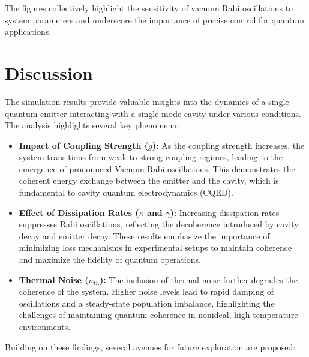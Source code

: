 \documentclass[conference]{IEEEtran}
\begin{document}
The figures collectively highlight the sensitivity of vacuum Rabi oscillations to system parameters and underscore the importance of precise control for quantum applications.

\section{Discussion}
The simulation results provide valuable insights into the dynamics of a single quantum emitter interacting with a single-mode cavity under various conditions. The analysis highlights several key phenomena:

\begin{itemize}
    \item \textbf{Impact of Coupling Strength ($g$):} As the coupling strength increases, the system transitions from weak to strong coupling regimes, leading to the emergence of pronounced Vacuum Rabi oscillations. This demonstrates the coherent energy exchange between the emitter and the cavity, which is fundamental to cavity quantum electrodynamics (CQED).
    \item \textbf{Effect of Dissipation Rates ($\kappa$ and $\gamma$):} Increasing dissipation rates suppresses Rabi oscillations, reflecting the decoherence introduced by cavity decay and emitter decay. These results emphasize the importance of minimizing loss mechanisms in experimental setups to maintain coherence and maximize the fidelity of quantum operations.
    \item \textbf{Thermal Noise ($n_{\text{th}}$):} The inclusion of thermal noise further degrades the coherence of the system. Higher noise levels lead to rapid damping of oscillations and a steady-state population imbalance, highlighting the challenges of maintaining quantum coherence in nonideal, high-temperature environments.
\end{itemize}



Building on these findings, several avenues for future exploration are proposed:
\end{document}
